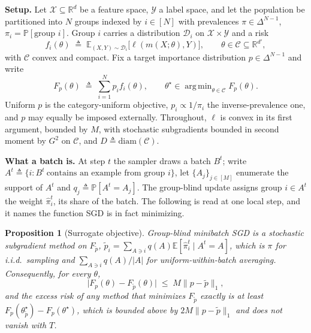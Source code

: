 \documentclass{article}
\newtheorem{proposition}[theorem]{Proposition}
\theoremstyle{definition}
\newcommand{\R}{\mathbb{R}}
\newcommand{\E}{\mathbb{E}}
\newcommand{\PP}{\mathbb{P}}
\newcommand{\Nn}[1]{[#1]}
\newcommand{\simplex}[1]{\Delta^{#1-1}}
\DeclareMathOperator*{\argmin}{arg\,min}
\begin{document}
\noindent\textbf{Setup.}
Let $\mathcal{X}\subseteq\R^d$ be a feature space, $\mathcal{Y}$ a label space,
and let the population be partitioned into $N$ groups indexed by $i\in\Nn{N}$
with prevalences $\pi\in\simplex{N}$, $\pi_i=\PP[\text{group }i]$. Group $i$
carries a distribution $\mathcal{D}_i$ on $\mathcal{X}\times\mathcal{Y}$ and a
risk
\[
f_i(\theta)\;\triangleq\;\E_{(X,Y)\sim\mathcal{D}_i}\big[\ell(m(X;\theta),Y)\big],
\qquad \theta\in\mathcal{C}\subseteq\R^{d'},
\]
with $\mathcal{C}$ convex and compact. Fix a target importance distribution
$p\in\simplex{N}$ and write
\begin{equation}
F_p(\theta)\;\triangleq\;\sum_{i=1}^{N}p_i f_i(\theta),
\qquad
\theta^\star\in\argmin_{\theta\in\mathcal{C}}F_p(\theta).
\label{eq:target}
\end{equation}
Uniform $p$ is the category-uniform objective, $p_i\propto 1/\pi_i$ the
inverse-prevalence one, and $p$ may equally be imposed externally. Throughout,
$\ell$ is convex in its first argument, bounded by $M$, with stochastic
subgradients bounded in second moment by $G^2$ on $\mathcal{C}$, and
$D\triangleq\mathrm{diam}(\mathcal{C})$.

\noindent\textbf{What a batch is.}
At step $t$ the sampler draws a batch $B^t$; write
$A^t\triangleq\{i: B^t\ \text{contains an example from group }i\}$, let
$\{A_j\}_{j\in\Nn{M}}$ enumerate the support of $A^t$ and
$q_j\triangleq\PP[A^t=A_j]$. The group-blind update assigns group $i\in A^t$ the
weight $\widehat{\pi}^t_i$, its share of the batch. The following is
\cite[Eq.~2]{rahimi2025fedavot} read at one local step, and it names the
function SGD is in fact minimizing.

\begin{proposition}[Surrogate objective]
\label{prop:surrogate}
Group-blind minibatch SGD is a stochastic subgradient method on $F_{\tilde p}$,
$\tilde p_i=\sum_{A\ni i}q(A)\E[\widehat{\pi}^t_i\mid A^t=A]$, which is $\pi$
for i.i.d.\ sampling and $\sum_{A\ni i}q(A)/|A|$ for uniform-within-batch
averaging. Consequently, for every $\theta$,
\begin{equation}
\big|F_p(\theta)-F_{\tilde p}(\theta)\big|\;\le\;M\|p-\tilde p\|_1 ,
\label{eq:surrogate-gap}
\end{equation}
and the excess risk of any method that minimizes $F_{\tilde p}$ exactly is at
least $F_p(\theta^\star_{\tilde p})-F_p(\theta^\star)$, which is bounded above
by $2M\|p-\tilde p\|_1$ and does not vanish with $T$.
\end{proposition}
\end{document}
